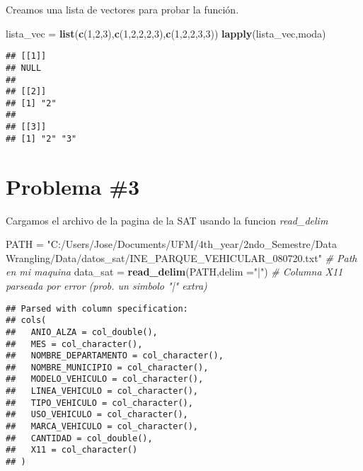 \documentclass[
]{article}
\newenvironment{Shaded}{\begin{snugshade}}{\end{snugshade}}
\newcommand{\CommentTok}[1]{\textcolor[rgb]{0.56,0.35,0.01}{\textit{#1}}}
\newcommand{\DataTypeTok}[1]{\textcolor[rgb]{0.13,0.29,0.53}{#1}}
\newcommand{\DecValTok}[1]{\textcolor[rgb]{0.00,0.00,0.81}{#1}}
\newcommand{\KeywordTok}[1]{\textcolor[rgb]{0.13,0.29,0.53}{\textbf{#1}}}
\newcommand{\NormalTok}[1]{#1}
\newcommand{\StringTok}[1]{\textcolor[rgb]{0.31,0.60,0.02}{#1}}
\begin{document}
Creamos una lista de vectores para probar la función.

\begin{Shaded}
\begin{Highlighting}[]
\NormalTok{lista_vec =}\StringTok{ }\KeywordTok{list}\NormalTok{(}\KeywordTok{c}\NormalTok{(}\DecValTok{1}\NormalTok{,}\DecValTok{2}\NormalTok{,}\DecValTok{3}\NormalTok{),}\KeywordTok{c}\NormalTok{(}\DecValTok{1}\NormalTok{,}\DecValTok{2}\NormalTok{,}\DecValTok{2}\NormalTok{,}\DecValTok{2}\NormalTok{,}\DecValTok{3}\NormalTok{),}\KeywordTok{c}\NormalTok{(}\DecValTok{1}\NormalTok{,}\DecValTok{2}\NormalTok{,}\DecValTok{2}\NormalTok{,}\DecValTok{3}\NormalTok{,}\DecValTok{3}\NormalTok{))}
\KeywordTok{lapply}\NormalTok{(lista_vec,moda)}
\end{Highlighting}
\end{Shaded}

\begin{verbatim}
## [[1]]
## NULL
## 
## [[2]]
## [1] "2"
## 
## [[3]]
## [1] "2" "3"
\end{verbatim}

\hypertarget{problema-3}{%
\section{Problema \#3}\label{problema-3}}

Cargamos el archivo de la pagina de la SAT usando la funcion
\emph{read\_delim}

\begin{Shaded}
\begin{Highlighting}[]
\NormalTok{PATH =}\StringTok{ "C:/Users/Jose/Documents/UFM/4th_year/2ndo_Semestre/Data Wrangling/Data/datos_sat/INE_PARQUE_VEHICULAR_080720.txt"} \CommentTok{# Path en mi maquina}
\NormalTok{data_sat =}\StringTok{ }\KeywordTok{read_delim}\NormalTok{(PATH,}\DataTypeTok{delim =}\StringTok{"|"}\NormalTok{) }\CommentTok{# Columna X11 parseada por error (prob. un simbolo "|" extra)}
\end{Highlighting}
\end{Shaded}

\begin{verbatim}
## Parsed with column specification:
## cols(
##   ANIO_ALZA = col_double(),
##   MES = col_character(),
##   NOMBRE_DEPARTAMENTO = col_character(),
##   NOMBRE_MUNICIPIO = col_character(),
##   MODELO_VEHICULO = col_character(),
##   LINEA_VEHICULO = col_character(),
##   TIPO_VEHICULO = col_character(),
##   USO_VEHICULO = col_character(),
##   MARCA_VEHICULO = col_character(),
##   CANTIDAD = col_double(),
##   X11 = col_character()
## )
\end{verbatim}
\end{document}
